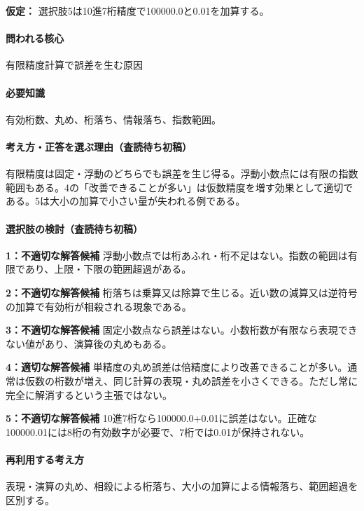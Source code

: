 \noindent\textbf{仮定：} 選択肢5は10進7桁精度で100000.0と0.01を加算する。\par

\paragraph{問われる核心} 有限精度計算で誤差を生む原因

\paragraph{必要知識} 有効桁数、丸め、桁落ち、情報落ち、指数範囲。

\paragraph{考え方・正答を選ぶ理由（査読待ち初稿）} 有限精度は固定・浮動のどちらでも誤差を生じ得る。浮動小数点には有限の指数範囲もある。4の「改善できることが多い」は仮数精度を増す効果として適切である。5は大小の加算で小さい量が失われる例である。

\paragraph{選択肢の検討（査読待ち初稿）}\mbox{}\par

\noindent\textbf{1：不適切な解答候補} 浮動小数点では桁あふれ・桁不足はない。指数の範囲は有限であり、上限・下限の範囲超過がある。\par

\noindent\textbf{2：不適切な解答候補} 桁落ちは乗算又は除算で生じる。近い数の減算又は逆符号の加算で有効桁が相殺される現象である。\par

\noindent\textbf{3：不適切な解答候補} 固定小数点なら誤差はない。小数桁数が有限なら表現できない値があり、演算後の丸めもある。\par

\noindent\textbf{4：適切な解答候補} 単精度の丸め誤差は倍精度により改善できることが多い。通常は仮数の桁数が増え、同じ計算の表現・丸め誤差を小さくできる。ただし常に完全に解消するという主張ではない。\par

\noindent\textbf{5：不適切な解答候補} 10進7桁なら100000.0+0.01に誤差はない。正確な100000.01には8桁の有効数字が必要で、7桁では0.01が保持されない。\par

\paragraph{再利用する考え方} 表現・演算の丸め、相殺による桁落ち、大小の加算による情報落ち、範囲超過を区別する。

